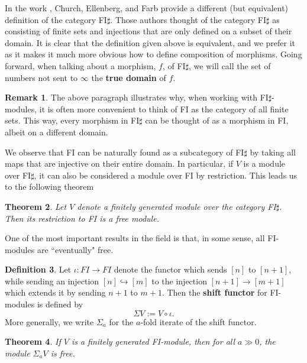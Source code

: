 \documentclass[12pt]{amsart}
\newtheorem{thm}{Theorem}[section]
\theoremstyle{definition}
\newtheorem{defn}[thm]{Definition}
\newtheorem{rmk}[thm]{Remark}
\begin{document}
In the work \cite{CEF}, Church, Ellenberg, and Farb provide a different (but equivalent) definition of the category FI$\sharp$. Those authors thought of the category FI$\sharp$ as consisting of finite sets and injections that are only defined on a subset of their domain. It is clear that the definition given above is equivalent, and we prefer it as it makes it much more obvious how to define composition of morphisms. 
Going forward, when talking about a morphism, $f$, of FI$\sharp$, we will call the set of numbers not sent to $\infty$ the \textbf{true domain} of $f$.

\begin{rmk}\label{sharpallsets}
  The above paragraph illustrates why, when working with FI$\sharp$-modules, it is often more convenient to think of FI as the category of all finite sets. This way, every morphism in FI$\sharp$ can be thought of as a morphism in FI, albeit on a different domain.
\end{rmk}

We observe that FI can be naturally found as a subcategory of FI$\sharp$ by taking all maps that are injective on their entire domain. In particular, if $V$ is a module over FI$\sharp$, it can also be considered a module over FI by restriction. This leads us to the following theorem

\begin{thm}\cite[Theorem 2.24]{CEF}\label{sharpisfree}
Let $V$ denote a finitely generated module over the category FI$\sharp$. Then its restriction to FI is a free module.
\end{thm}

One of the most important results in the field is that, in some sense, all FI-modules are ``eventually" free.

\begin{defn}
    Let $\iota:FI \rightarrow FI$ denote the functor which sends $[n]$ to $[n+1]$, while sending an injection $[n] \hookrightarrow [m]$ to the injection $[n+1] \rightarrow [m+1]$ which extends it by sending $n+1$ to $m+1$. Then the \textbf{shift functor} for FI-modules is defined by
    \[
    \Sigma V := V \circ \iota.
    \]
    More generally, we write $\Sigma_a$ for the $a$-fold iterate of the shift functor.
\end{defn}

\begin{thm}\cite{N}\label{shiftThm}
    If $V$ is a finitely generated FI-module, then for all $a \gg 0$, the module $\Sigma_a V$ is free.
\end{thm}
\end{document}
